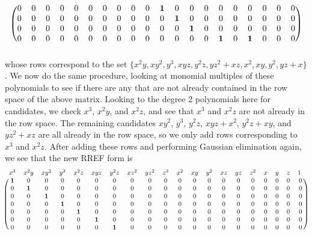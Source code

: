 \documentclass[11pt]{article}
\begin{document}
\[\begin{blockarray}{cccccccccccccccccccc}
\begin{block}{(cccccccccccccccccccc)}
		0 & 0 & 0 & 0 & 0 & 0 & 0 & 0 & 0 & 0 & \mathbf{1} & 0 & 0 & 0 & 0 & 0 & 0 & 0 & 0 & 0 \\
		0 & 0 & 0 & 0 & 0 & 0 & 0 & 0 & 0 & 0 & 0 & \mathbf{1} & 0 & 0 & 0 & 0 & 0 & 0 & 0 & 0 \\
		0 & 0 & 0 & 0 & 0 & 0 & 0 & 0 & 0 & 0 & 0 & 0 & \mathbf{1} & 0 & 0 & 0 & 0 & 0 & 0 & 0 \\
		0 & 0 & 0 & 0 & 0 & 0 & 0 & 0 & 0 & 0 & 0 & 0 & 0 & 0 & \mathbf{1} & 0 & \mathbf{1} & 0 & 0 & 0 \\
	\end{block}
\end{blockarray} \] whose rows correspond to the set $\{x^2y, xy^2, y^3, xyz, y^2z, yz^2 + xz, x^2, xy, y^2, yz + x\}$. We now do the same procedure, looking at monomial multiples of these polynomials to see if there are any that are not already contained in the row space of the above matrix. Looking to the degree 2 polynomials here for candidates, we check $x^3$, $x^2y$, and $x^2z$, and see that $x^3$ and $x^2z$ are not already in the row space. The remaining candidates $xy^2$, $y^3$, $y^2z$, $xyz + x^2$, $y^2z + xy$, and $yz^2 + xz$ are all already in the row space, so we only add rows corresponding to $x^3$ and $x^2z$. After adding these rows and performing Gaussian elimination again, we see that the new RREF form is \[ \begin{blockarray}{cccccccccccccccccccc}
	x^3 & x^2y & xy^2 & y^3 & x^2z & xyz & y^2z & xz^2 & yz^2 & z^3 & x^2 & xy & y^2 & xz & yz & z^2 & x & y & z & 1\,\, \\
	\begin{block}{(cccccccccccccccccccc)}
		\mathbf{1} & 0 & 0 & 0 & 0 & 0 & 0 & 0 & 0 & 0 & 0 & 0 & 0 & 0 & 0 & 0 & 0 & 0 & 0 & 0 \\
		0 & \mathbf{1} & 0 & 0 & 0 & 0 & 0 & 0 & 0 & 0 & 0 & 0 & 0 & 0 & 0 & 0 & 0 & 0 & 0 & 0 \\
		0 & 0 & \mathbf{1} & 0 & 0 & 0 & 0 & 0 & 0 & 0 & 0 & 0 & 0 & 0 & 0 & 0 & 0 & 0 & 0 & 0 \\
		0 & 0 & 0 & \mathbf{1} & 0 & 0 & 0 & 0 & 0 & 0 & 0 & 0 & 0 & 0 & 0 & 0 & 0 & 0 & 0 & 0 \\
		0 & 0 & 0 & 0 & \mathbf{1} & 0 & 0 & 0 & 0 & 0 & 0 & 0 & 0 & 0 & 0 & 0 & 0 & 0 & 0 & 0 \\
		0 & 0 & 0 & 0 & 0 & \mathbf{1} & 0 & 0 & 0 & 0 & 0 & 0 & 0 & 0 & 0 & 0 & 0 & 0 & 0 & 0 \\
		0 & 0 & 0 & 0 & 0 & 0 & \mathbf{1} & 0 & 0 & 0 & 0 & 0 & 0 & 0 & 0 & 0 & 0 & 0 & 0 & 0 \\

\end{block}
\end{blockarray}\]
\end{document}
